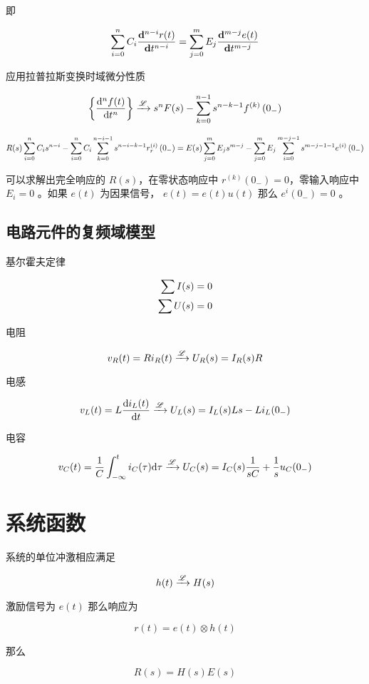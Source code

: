 \documentclass[cn,11pt,chinese,black,simple]{../elegantbook}
\begin{document}
即

\[
\displaystyle\sum_{i=0}^{n} C_{i} \dfrac{\mathbf{d}^{n-i} {r}({t})}{\mathbf{d} t^{n-i}}=\displaystyle\sum_{j=0}^{m} {E}_{j} \dfrac{\mathbf{d}^{m-j} {e}({t})}{\mathbf{d} t^{m-j}}
\]

应用拉普拉斯变换时域微分性质

\[
\left\{\dfrac{\mathrm{d}^{n} f(t)}{\mathrm{d} t^{n}}\right\}\xrightarrow{\mathscr{L}} s^{n} F(s)-\displaystyle\sum_{k=0}^{n-1} s^{n-k-1} f^{(k)}\left(0_{-}\right)
\]

\[
    R(s) \displaystyle\sum_{i=0}^{n} C_{i} s^{n-i}-\displaystyle\sum_{i=0}^{n} C_{i} \displaystyle\sum_{k=0}^{n-i-1} s^{n-i-k-1} r_{r}^{(i)}\left(0_{-}\right)=E(s) \displaystyle\sum_{j=0}^{m} E_{j} s^{m-j}-\displaystyle\sum_{j=0}^{m} E_{j} \displaystyle\sum_{i=0}^{m-j-1} s^{m-j-1-1} e^{(i)}\left(0_{-}\right)
\]

可以求解出完全响应的 \(R(s)\)，在零状态响应中 \(r^{(k)}(0_-) = 0\)，零输入响应中 \(E_i = 0\) 。如果 \(e(t)\) 为因果信号， \(e(t) = e(t)u(t)\) 那么 \(e^{i}(0_-) = 0\) 。

\subsection{电路元件的复频域模型}

基尔霍夫定律 

\[\begin{aligned}
    \displaystyle\sum I(s) &= 0\\
    \displaystyle\sum U(s) &= 0
\end{aligned}\]

电阻

\[v_R(t) = R i_R(t) \xrightarrow{\mathscr{L}} U_R(s) = I_R(s) R\]

电感 

\[v_L(t) = L \dfrac{\mathrm{d}i_L(t)}{\mathrm{d}t} \xrightarrow{\mathscr{L}} U_L(s) = I_L(s) L s - L i_L(0_-)\]

电容

\[v_C(t) = \dfrac{1}{C}\int_{-\infty}^t i_C(\tau) \mathrm{d}\tau \xrightarrow{\mathscr{L}} U_C(s) = I_C(s) \dfrac{1}{sC} + \dfrac{1}{s} u_C(0_-)\]


\section{系统函数}

系统的单位冲激相应满足 

\[h(t) \xrightarrow{\mathscr{L}} H(s)\]

激励信号为 \(e(t)\) 那么响应为 

\[r(t) = e(t) \otimes h(t)\]

那么

\[R(s) = H(s) E(s)\]
\end{document}
